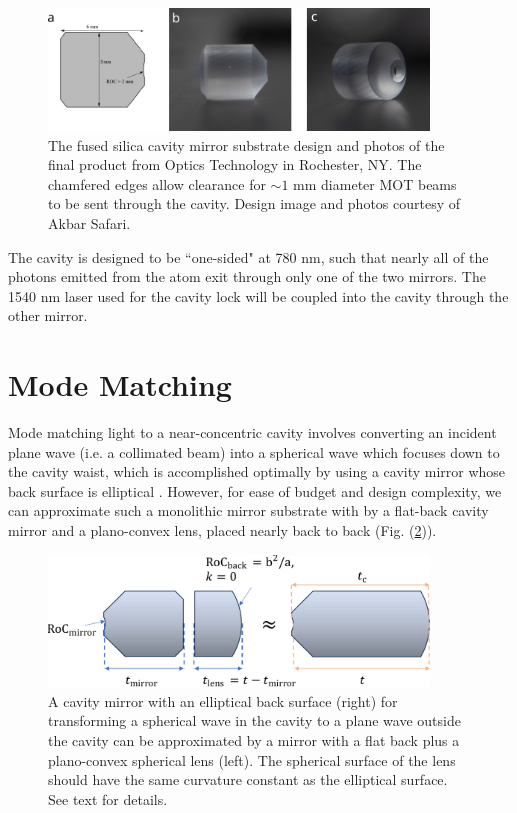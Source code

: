 \begin{figure}[!ht]
    \centering
    \includegraphics[width=0.9\textwidth]{Images/cavity_mirror_substrate.pdf}
    \caption{The fused silica cavity mirror substrate design and photos of the final product from Optics Technology in Rochester, NY. The chamfered edges allow clearance for $\sim1$ mm diameter MOT beams to be sent through the cavity. Design image and photos courtesy of Akbar Safari.}
    \label{fig:cavmirror_substrate}
\end{figure}

The cavity is designed to be ``one-sided" at 780 nm, such that nearly all of the photons emitted from the atom exit through only one of the two mirrors. The 1540 nm laser used for the cavity lock will be coupled into the cavity through the other mirror. 

\section{Mode Matching}\label{sec:cavmatching}

Mode matching light to a near-concentric cavity involves converting an incident plane wave (i.e. a collimated beam) into a spherical wave which focuses down to the cavity waist, which is accomplished optimally by using a cavity mirror whose back surface is elliptical \cite{Durak_2014}. However, for ease of budget and design complexity, we can approximate such a monolithic mirror substrate with by a flat-back cavity mirror and a plano-convex lens, placed nearly back to back (Fig. (\ref{fig:modematchapprox})). 

\begin{figure}[!ht]
    \centering
    \includegraphics[width=0.9\textwidth]{Images/mode_matching_mirror_approximation.pdf}
    \caption{A cavity mirror with an elliptical back surface (right) for transforming a spherical wave in the cavity to a plane wave outside the cavity can be approximated by a mirror with a flat back plus a plano-convex spherical lens (left). The spherical surface of the lens should have the same curvature constant as the elliptical surface. See text for details.}
    \label{fig:modematchapprox}
\end{figure}

